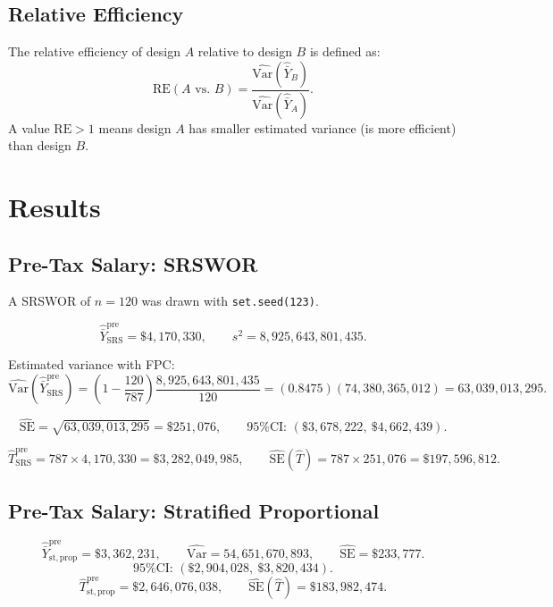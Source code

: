 \documentclass[12pt]{article}
\newcommand{\VarHat}{\widehat{\mathrm{Var}}}
\newcommand{\SEHat}{\widehat{\mathrm{SE}}}
\begin{document}
\subsection{Relative Efficiency}
\label{sec:re}

The relative efficiency of design $A$ relative to design $B$ is defined as:
\[
  \mathrm{RE}(A \text{ vs.\ } B)
  = \frac{\VarHat\!\left(\hat{\bar{Y}}_{B}\right)}{\VarHat\!\left(\hat{\bar{Y}}_{A}\right)}.
\]
A value $\mathrm{RE} > 1$ means design $A$ has smaller estimated variance (is more
efficient) than design $B$.

\newpage

\section{Results}
\label{sec:results}

\subsection{Pre-Tax Salary: SRSWOR}

A SRSWOR of $n = 120$ was drawn with \texttt{set.seed(123)}.

\[
  \hat{\bar{Y}}_{\mathrm{SRS}}^{\mathrm{pre}} = \$4{,}170{,}330,
  \qquad
  s^2 = 8{,}925{,}643{,}801{,}435.
\]

Estimated variance with FPC:
\[
  \VarHat\!\left(\hat{\bar{Y}}_{\mathrm{SRS}}^{\mathrm{pre}}\right)
  = \left(1 - \frac{120}{787}\right)\frac{8{,}925{,}643{,}801{,}435}{120}
  = (0.8475)(74{,}380{,}365{,}012)
  = 63{,}039{,}013{,}295.
\]

\[
  \SEHat = \sqrt{63{,}039{,}013{,}295} = \$251{,}076,
  \qquad
  \text{95\% CI: } (\$3{,}678{,}222,\ \$4{,}662{,}439).
\]

\[
  \hat{T}_{\mathrm{SRS}}^{\mathrm{pre}} = 787 \times 4{,}170{,}330 = \$3{,}282{,}049{,}985,
  \qquad
  \SEHat(\hat{T}) = 787 \times 251{,}076 = \$197{,}596{,}812.
\]

\subsection{Pre-Tax Salary: Stratified Proportional}

\[
  \hat{\bar{Y}}_{\mathrm{st,prop}}^{\mathrm{pre}} = \$3{,}362{,}231,
  \qquad
  \VarHat = 54{,}651{,}670{,}893,
  \qquad
  \SEHat = \$233{,}777.
\]
\[
  \text{95\% CI: } (\$2{,}904{,}028,\ \$3{,}820{,}434).
\]
\[
  \hat{T}_{\mathrm{st,prop}}^{\mathrm{pre}} = \$2{,}646{,}076{,}038,
  \qquad
  \SEHat(\hat{T}) = \$183{,}982{,}474.
\]
\end{document}
